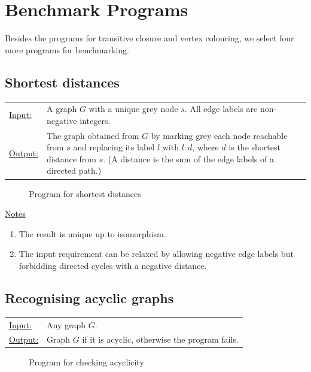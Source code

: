 \section{Benchmark Programs}
\label{sec:benchmark}
 
Besides the programs for transitive closure and vertex colouring, we select four more programs for benchmarking.


\subsection{Shortest distances}

\begin{tabular}{lp{10.5cm}}
\ul{Input:} & A graph $G$ with a unique grey node $s$. All edge labels are non-negative integers. \\
\ul{Output:} & The graph obtained from $G$ by marking grey each node reachable from $s$ and replacing its label $l$\/ with $l{:}d$, where $d$\/ is the shortest distance from $s$. (A distance is the sum of the edge labels of a directed path.)
\end{tabular}
  
\begin{figure}[htb]
\begin{center}

\end{center}
\caption{Program for shortest distances}\label{fig:shortest-distances}
\end{figure}

\ul{Notes}
\begin{enumerate}
\setlength{\itemsep}{-.5ex}
\item The result is unique up to isomorphism.
\item The input requirement can be relaxed by allowing negative edge labels but forbidding directed cycles with a negative distance.
\end{enumerate}


\subsection{Recognising acyclic graphs}
\label{sec:acyclic}

\begin{tabular}{lp{10.5cm}}
\ul{Input:} & Any graph $G$. \\
\ul{Output:} & Graph $G$ if it is acyclic, otherwise the program fails.
\end{tabular}
  
\begin{figure}[htb]
\begin{center}

\end{center}
\caption{Program for checking acyclicity}\label{fig:acyclicity}
\end{figure}

